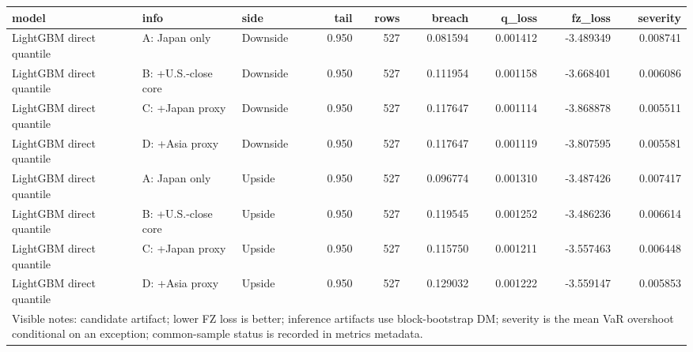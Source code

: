 \begin{tabular}{lllrrrrrr}
\toprule
model & info & side & tail & rows & breach & q_loss & fz_loss & severity \\
\midrule
LightGBM direct quantile & A: Japan only & Downside & 0.950 & 527 & 0.081594 & 0.001412 & -3.489349 & 0.008741 \\
LightGBM direct quantile & B: +U.S.-close core & Downside & 0.950 & 527 & 0.111954 & 0.001158 & -3.668401 & 0.006086 \\
LightGBM direct quantile & C: +Japan proxy & Downside & 0.950 & 527 & 0.117647 & 0.001114 & -3.868878 & 0.005511 \\
LightGBM direct quantile & D: +Asia proxy & Downside & 0.950 & 527 & 0.117647 & 0.001119 & -3.807595 & 0.005581 \\
LightGBM direct quantile & A: Japan only & Upside & 0.950 & 527 & 0.096774 & 0.001310 & -3.487426 & 0.007417 \\
LightGBM direct quantile & B: +U.S.-close core & Upside & 0.950 & 527 & 0.119545 & 0.001252 & -3.486236 & 0.006614 \\
LightGBM direct quantile & C: +Japan proxy & Upside & 0.950 & 527 & 0.115750 & 0.001211 & -3.557463 & 0.006448 \\
LightGBM direct quantile & D: +Asia proxy & Upside & 0.950 & 527 & 0.129032 & 0.001222 & -3.559147 & 0.005853 \\
\midrule
\multicolumn{9}{l}{\footnotesize Visible notes: candidate artifact; lower FZ loss is better; inference artifacts use block-bootstrap DM; severity is the mean VaR overshoot conditional on an exception; common-sample status is recorded in metrics metadata.} \\
\bottomrule
\end{tabular}
